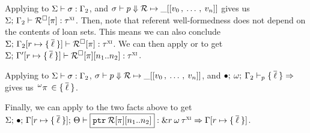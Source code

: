 \begin{preservation}
{    Applying  to
    $\Sigma \vdash \sigma : \Gamma_2$, and
    $ \sigma \vdash p \Downarrow \mathcal{R} \mapsto \_ [
      [v_0 \, , \: \ldots \, , \: v_n]
    ] $ gives us $\Sigma; \, \Gamma_2 \vdash 
      \mathcal{R}^\square[\pi]
     : \tau^\textsc{xi}$. Then, note that referent well-formedness does not
    depend on the contents of loan sets. This means we can also conclude
    $\oxreferentvalidity{\oxglobalctx}{
      \oxupdate{\oxvarctx_2}{
        \oxloanctxentry{\oxcprov}{
          \oxset{\overline{\oxloan}}
        }
      }
    }{
      \oxreferentctx[\oxplace]
    }{\oxxitype}$. We can then apply  or
     to get $\oxreferentvalidity{\oxglobalctx}{
      \oxupdate{\oxvarctx^\prime}{
        \oxloanctxentry{\oxcprov}{
          \oxset{\overline{\oxloan}}
        }
      }
    }{
      \oxslice{\oxreferentctx[\oxplace]}{\oxnum_1}{\oxnum_2}
    }{\oxxitype}$.

    Applying  to
    $\Sigma \vdash \sigma : \Gamma_2$,
    $ \sigma \vdash p \Downarrow \mathcal{R} \mapsto \_ [
      [v_0 \, , \: \ldots \, , \: v_n]
    ] $, and
    $\oxmusafety{\oxemptyctx}{\oxvarctx_2}{\oxmuta}{\oxplaceexpr}{
      \oxset{\overline{\oxloan}}
    }$ gives us $\,^{\omega}\pi\, \in \{ \: \overline{\ell} \: \}$.

    Finally, we can apply  to the two facts above to get
    $\oxtypjudge{\oxglobalctx}{\oxemptyctx}{\oxkontctx}{
      \oxupdate{\oxvarctx}{
        \oxloanctxentry{\oxcprov}{
          \oxset{\overline{\oxloan}}
        }
      }
    }{
      \oxsliceptr{\oxreferent[\oxplace]}{\oxnum_1}{\oxnum_2}
    }{\oxtref{\oxcprov}{\oxmuta}{\oxxitype}}{
      \oxupdate{\oxvarctx}{
        \oxloanctxentry{\oxcprov}{
          \oxset{\overline{\oxloan}}
        }
      }
    }$.
  }


\end{preservation}

